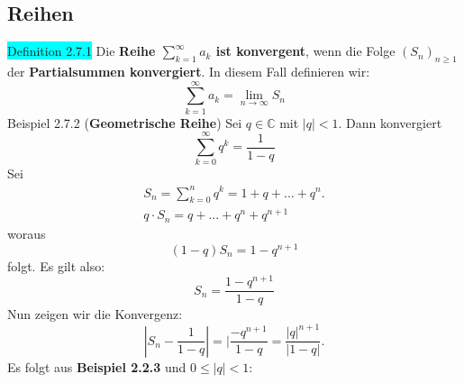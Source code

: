 \documentclass[landscape, 10pt]{article}
\newcommand{\C}{\mathbb{C}}
\begin{document}
\begin{multicols}{3}
       \subsection{Reihen}
              \colorbox{cyan}{Definition 2.7.1} 
                     Die \textbf{Reihe 
                     $\sum_{k=1}^\infty a_k$ ist konvergent}, 
                     wenn die Folge 
                     \textcolor{NavyBlue}{$(S_n)_{n\geqslant1}$} 
                     der \textbf{Partialsummen konvergiert}. In 
                     diesem Fall definieren wir:
                     \begin{equation*}
                            \sum_{k=1}^\infty a_k
                            =\lim\limits_{n\to\infty}S_n   
                     \end{equation*}
              \colorbox{Dandelion}{Beispiel 2.7.2} 
              (\textbf{Geometrische Reihe}) 
                     Sei \textcolor{NavyBlue}{$q\in\C$} mit 
                     \textcolor{NavyBlue}{$|q|<1$}. Dann konvergiert
                     \begin{equation*}
                            \sum_{k=0}^\infty q^k=\frac{1}{1-q}
                     \end{equation*}
                     Sei 
                     \begin{align*}
                            S_n=\sum_{k=0}^n q^k=1+q+...+q^n.\\
                            q\cdot S_n=q+...+q^n+q^{n+1}
                     \end{align*}
                     woraus
                     \begin{equation*}
                            (1-q)S_n=1-q^{n+1}
                     \end{equation*}
                     folgt. Es gilt also: 
                     \begin{equation*}
                            S_n=\frac{1-q^{n+1}}{1-q}
                     \end{equation*}
                     Nun zeigen wir die Konvergenz: 
                     \begin{equation*}
                            |S_n-\frac{1}{1-q}|
                            =|\frac{-q^{n+1}}{1-q}
                            =\frac{|q|^{n+1}}{|1-q|}.
                     \end{equation*}
                     Es folgt aus
                     \textbf{Beispiel 2.2.3} 
                     und \textcolor{NavyBlue}{$0\leqslant|q|<1$}:
                     \begin{equation*}

\end{equation*}
\end{multicols}
\end{document}
